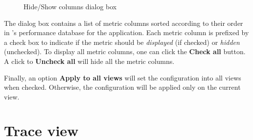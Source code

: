 \begin{itemize}
\begin{figure}[t]
\caption{Hide/Show columns dialog box}
\label{fig:hpcviewer-hide-show-columns}
\end{figure}

The dialog box contains a list of metric columns sorted according to their order in \HPCToolkit{}'s performance database for the application.
Each metric column is prefixed by a check box to indicate if the metric should be \textit{displayed} (if checked) or \textit{hidden} (unchecked).
To display all metric columns, one can click the \textbf{Check all} button.
A click to \textbf{Uncheck all} will hide all the metric columns.

Finally, an option \textbf{Apply to all views} will set the configuration into all views when checked.
Otherwise, the configuration will be applied only on the current view.

\end{itemize}



\section{Trace view}



\newcommand{\crosshair}{crosshair}
\newcommand{\traceview}{Main View}
\newcommand{\depthview}{Depth View}
\newcommand{\summaryview}{Summary View}
\newcommand{\miniview}{Mini Map View}
\newcommand{\callview}{Call Path View}
\newcommand{\statview}{Statistics View}


